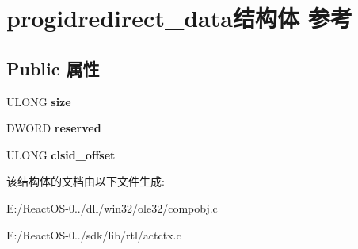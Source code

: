 \hypertarget{structprogidredirect__data}{}\section{progidredirect\+\_\+data结构体 参考}
\label{structprogidredirect__data}
\subsection*{Public 属性}
\begin{DoxyCompactItemize}
\item 
\mbox{\label{structprogidredirect__data_ae1ca811297cc85e284fdb82bddaa52af}} 
U\+L\+O\+NG {\bfseries size}
\item 
\mbox{\label{structprogidredirect__data_ae99fee983ecf0ccc0c69b85030925eaf}} 
D\+W\+O\+RD {\bfseries reserved}
\item 
\mbox{\label{structprogidredirect__data_a9dcbea39f94532b66ef74c0f81e630e4}} 
U\+L\+O\+NG {\bfseries clsid\+\_\+offset}
\end{DoxyCompactItemize}


该结构体的文档由以下文件生成\+:\begin{DoxyCompactItemize}
\item 
E\+:/\+React\+O\+S-\/0../dll/win32/ole32/compobj.\+c\item 
E\+:/\+React\+O\+S-\/0../sdk/lib/rtl/actctx.\+c\end{DoxyCompactItemize}
